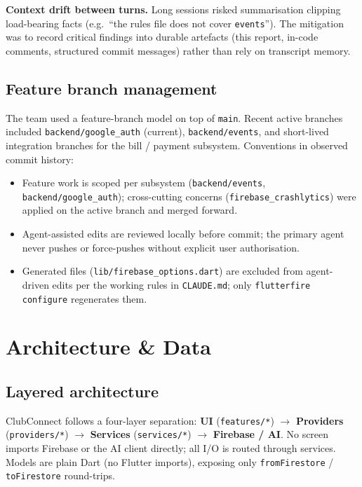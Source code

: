 \documentclass[11pt,a4paper]{article}
\begin{document}
\textbf{Context drift between turns.} Long sessions risked summarisation
clipping load-bearing facts (e.g.\ ``the rules file does not cover
\texttt{events}''). The mitigation was to record critical findings into
durable artefacts (this report, in-code comments, structured commit
messages) rather than rely on transcript memory.

\subsection{Feature branch management}

The team used a feature-branch model on top of \texttt{main}. Recent active
branches included \texttt{backend/google\_auth} (current),
\texttt{backend/events}, and short-lived integration branches for the bill /
payment subsystem. Conventions in observed commit history:

\begin{itemize}[leftmargin=*,nosep]
  \item Feature work is scoped per subsystem (\texttt{backend/events},
        \texttt{backend/google\_auth}); cross-cutting concerns
        (\texttt{firebase\_crashlytics}) were applied on the active branch
        and merged forward.
  \item Agent-assisted edits are reviewed locally before commit; the
        primary agent never pushes or force-pushes without explicit
        user authorisation.
  \item Generated files (\texttt{lib/firebase\_options.dart}) are
        excluded from agent-driven edits per the working rules in
        \texttt{CLAUDE.md}; only \texttt{flutterfire configure}
        regenerates them.
\end{itemize}

\section{Architecture \& Data}
\label{sec:arch}

\subsection{Layered architecture}

ClubConnect follows a four-layer separation:
\textbf{UI} (\texttt{features/*}) $\rightarrow$
\textbf{Providers} (\texttt{providers/*}) $\rightarrow$
\textbf{Services} (\texttt{services/*}) $\rightarrow$
\textbf{Firebase / AI}.
No screen imports Firebase or the AI client directly; all I/O is routed
through services. Models are plain Dart (no Flutter imports), exposing
only \texttt{fromFirestore} / \texttt{toFirestore} round-trips.
\end{document}
